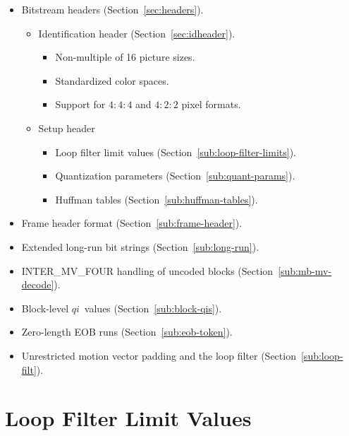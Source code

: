 \documentclass[9pt,letterpaper]{book}
\newcommand{\idx}[1]{{\ensuremath{\mathit{#1}}}}
\newcommand{\qi}{\idx{qi}}
\numberwithin{equation}{chapter}
\numberwithin{figure}{chapter}
\numberwithin{table}{chapter}
\begin{document}
\begin{itemize}
\item
Bitstream headers (Section~\ref{sec:headers}).
\begin{itemize}
\item
Identification header (Section~\ref{sec:idheader}).
\begin{itemize}
\item
Non-multiple of 16 picture sizes.
\item
Standardized color spaces.
\item
Support for $4:4:4$ and $4:2:2$ pixel formats.
\end{itemize}
\item
Setup header
\begin{itemize}
\item
Loop filter limit values (Section~\ref{sub:loop-filter-limits}).
\item
Quantization parameters (Section~\ref{sub:quant-params}).
\item
Huffman tables (Section~\ref{sub:huffman-tables}).
\end{itemize}
\end{itemize}
\item
Frame header format (Section~\ref{sub:frame-header}).
\item
Extended long-run bit strings (Section~\ref{sub:long-run}).
\item
INTER\_MV\_FOUR handling of uncoded blocks (Section~\ref{sub:mb-mv-decode}).
\item
Block-level \qi\ values (Section~\ref{sub:block-qis}).
\item
Zero-length EOB runs (Section~\ref{sub:eob-token}).
\item
Unrestricted motion vector padding and the loop filter
 (Section~\ref{sub:loop-filt}).
\end{itemize}

\section{Loop Filter Limit Values}
\label{app:vp3-loop-filter-limits}
\end{document}
